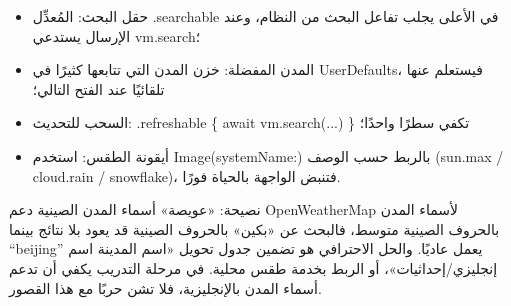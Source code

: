 
\begin{itemize}
  \item حقل البحث: المُعدِّل .searchable في الأعلى يجلب تفاعل البحث من النظام، وعند الإرسال يستدعي vm.search؛
  \item المدن المفضلة: خزن المدن التي تتابعها كثيرًا في UserDefaults، فيستعلم عنها تلقائيًا عند الفتح التالي؛
  \item السحب للتحديث: .refreshable \{ await vm.search(...) \} تكفي سطرًا واحدًا؛
  \item أيقونة الطقس: استخدم Image(systemName:) بالربط حسب الوصف (sun.max / cloud.rain / snowflake)، فتنبض الواجهة بالحياة فورًا.
\end{itemize}

\begin{tcbinfo}{نصيحة: «عويصة» أسماء المدن الصينية}
دعم OpenWeatherMap لأسماء المدن بالحروف الصينية متوسط، فالبحث عن «بكين» بالحروف الصينية قد يعود بلا نتائج بينما “beijing” يعمل عاديًا. والحل الاحترافي هو تضمين جدول تحويل «اسم المدينة اسم إنجليزي/إحداثيات»، أو الربط بخدمة طقس محلية. في مرحلة التدريب يكفي أن تدعم أسماء المدن بالإنجليزية، فلا تشن حربًا مع هذا القصور.

\end{tcbinfo}

